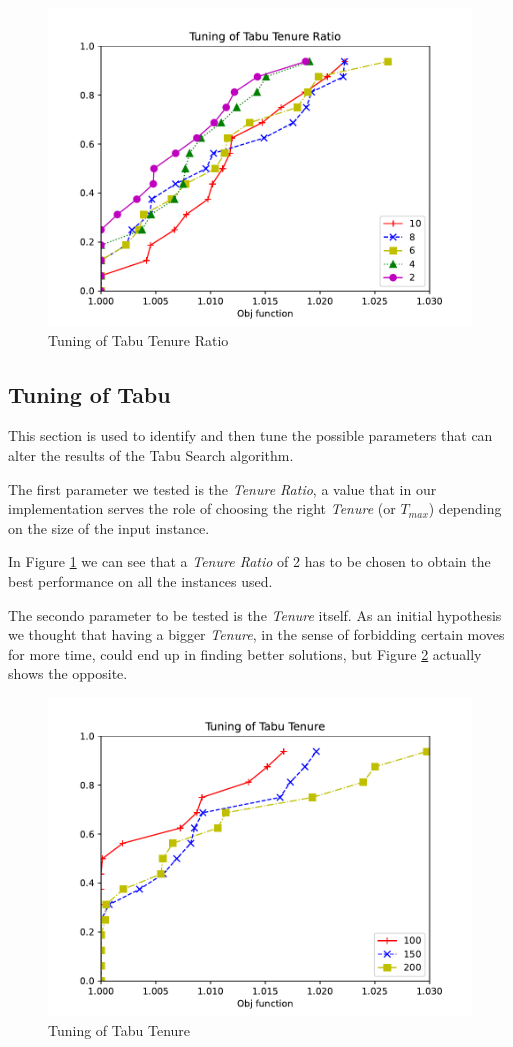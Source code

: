 \begin{figure}[!h]
    \centering
    \includegraphics[width=\textwidth]{images/tabu.pdf}
    \caption{Tuning of Tabu Tenure Ratio}
    \label{fig:tabu}
\end{figure}
\subsection{Tuning of Tabu}

This section is used to identify and then tune the possible parameters that can alter the results of the Tabu Search algorithm.



The first parameter we tested is the \textit{Tenure Ratio}, a value that in our implementation serves the role of choosing the right \textit{Tenure} (or $T_{max}$) depending on the size of the input instance.

In Figure \ref*{fig:tabu} we can see that a \textit{Tenure Ratio} of 2 has to be chosen to obtain the best performance on all the instances used.



The secondo parameter to be tested is the \textit{Tenure} itself. As an initial hypothesis we thought that having a bigger \textit{Tenure}, in the sense of forbidding certain moves for more time, could end up in finding better solutions, but Figure \ref*{fig:tabu2} actually shows the opposite.

\begin{figure}[!h]
    \centering
    \includegraphics[width=\textwidth]{images/tabu2.pdf}
    \caption{Tuning of Tabu Tenure}
    \label{fig:tabu2}
\end{figure}